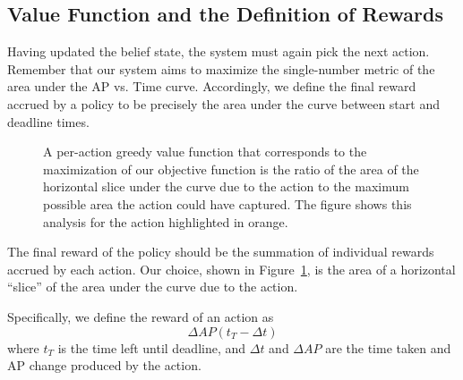 \subsection{Value Function and the Definition of Rewards}
Having updated the belief state, the system must again pick the next action.
Remember that our system aims to maximize the single-number metric of the area under the AP vs. Time curve.
Accordingly, we define the final reward accrued by a policy to be precisely the area under the curve between start and deadline times.

\begin{figure}[htb]
  \caption{\label{fig:rewards}A per-action greedy value function that corresponds to the maximization of our objective function is the ratio of the area of the horizontal slice under the curve due to the action to the maximum possible area the action could have captured. The figure shows this analysis for the action highlighted in orange.}
\end{figure}

The final reward of the policy should be the summation of individual rewards accrued by each action.
Our choice, shown in Figure~\ref{fig:rewards}, is the area of a horizontal ``slice'' of the area under the curve due to the action.

Specifically, we define the reward of an action as
\begin{equation}\label{eq:advanced}
\Delta AP (t_T-\Delta t)
\end{equation}
where $t_T$ is the time left until deadline, and $\Delta t$ and $\Delta AP$ are the time taken and AP change produced by the action.

